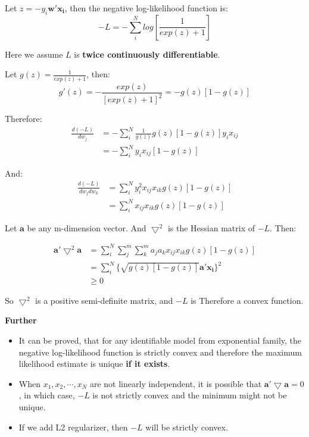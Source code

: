 \documentclass{article}
\newcommand{\V}[1]{\boldsymbol{#1}}
\newcommand{\TM}{\bigtriangledown}
\begin{document}
Let \(z=-y_i\V{w'}\V{x_i}\), then the negative log-likelihood function is:
\begin{equation}
-L=-\sum_{i}^{N}log[\frac{1}{exp(z)+1}]
\end{equation}

Here we assume \(L\) is \textbf{twice continuously differentiable}.

Let \(g(z)=\frac{1}{exp(z)+1}\), then:
\begin{equation}
g'(z)=-\frac{exp(z)}{[exp(z)+1]^2}=-g(z)[1-g(z)]
\end{equation}

Therefore:
\begin{equation}
\begin{split}
\frac{d(-L)}{dw_j}&=-\sum_{i}^N\frac{1}{g(z)}g(z)[1-g(z)]y_ix_{ij}\\
&=-\sum_{i}^Ny_ix_{ij}[1-g(z)]
\end{split}
\end{equation}

And:
\begin{equation}
\begin{split}
\frac{d(-L)}{dw_jdw_k}&=\sum_{i}^Ny_i^2x_{ij}x_{ik}g(z)[1-g(z)]\\
&=\sum_{i}^Nx_{ij}x_{ik}g(z)[1-g(z)]
\end{split}
\end{equation}

Let \(\V{a}\) be any m-dimension vector. And \(\TM^2\) is the Hessian matrix
of \(-L\). Then:

\begin{equation}
\begin{split}
\V{a'}\TM^2\V{a}&=\sum_{i}^N\sum_{j}^m\sum_{k}^ma_ja_kx_{ij}x_{ik}g(z)[1-g(z)]\\
&=\sum_{i}^N{\{\sqrt{g(z)[1-g(z)]}\V{a'}\V{x_i}\}^2}\\
&\geq 0
\end{split}
\end{equation}

So \(\TM^2\) is a positive semi-definite matrix, and \(-L\) is Therefore
a convex function.

\vspace{2mm}
\textbf{Further}
\begin{itemize}
\item It can be proved, that for any identifiable model from exponential family,
the negative log-likelihood function is strictly convex and therefore
the maximum likelihood estimate is unique \textbf{if it exists}.
\item When \(x_1, x_2, \cdots, x_N\) are not linearly independent, it is possible
that \(\V{a'}\TM\V{a}=0\), in which case, \(-L\) is not strictly convex and
the minimum might not be unique.
\item If we add L2 regularizer, then \(-L\) will be strictly convex.
\end{itemize}
\end{document}
